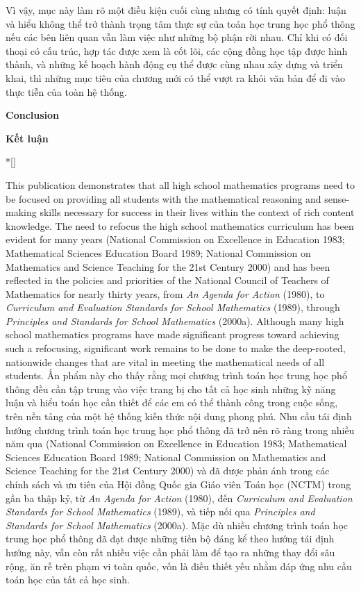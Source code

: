 \documentclass[
  10pt,
  a4paper,
  landscape,
  twoside,
  openany
]{scrbook}
\newcommand{\EN}[1]{#1}
\newcommand{\VI}[1]{#1}
\newcommand{\NOTE}[1]{#1}
\newcommand{\ParallelSection}[3]{%
  \refstepcounter{section}%
  \phantomsection
  \addcontentsline{toc}{section}{\hspace{0.3\baselineskip}#2}%
  \markright{#2}%
  {\noindent\normalfont\bfseries\large #1\par}
  \switchcolumn
  {\noindent\normalfont\bfseries\large #2\par}
  \switchcolumn
  {\noindent\normalfont #3\par}
  \switchcolumn[0]*[\vspace{0.7\baselineskip}]
}
\begin{document}
{{Vì vậy, mục này làm rõ một điều kiện cuối cùng nhưng có tính quyết định: luận và hiểu không thể trở thành trọng tâm thực sự của toán học trung học phổ thông nếu các bên liên quan vẫn làm việc như những bộ phận rời nhau. Chỉ khi có đối thoại có cấu trúc, hợp tác được xem là cốt lõi, các cộng đồng học tập được hình thành, và những kế hoạch hành động cụ thể được cùng nhau xây dựng và triển khai, thì những mục tiêu của chương mới có thể vượt ra khỏi văn bản để đi vào thực tiễn của toàn hệ thống.}
}

\ParallelSection
{Conclusion}
{Kết luận}
{}

\TriPara
{
\EN{This publication demonstrates that all high school mathematics programs need to be focused on providing all students with the mathematical reasoning and sense-making skills necessary for success in their lives within the context of rich content knowledge. The need to refocus the high school mathematics curriculum has been evident for many years (National Commission on Excellence in Education 1983; Mathematical Sciences Education Board 1989; National Commission on Mathematics and Science Teaching for the 21st Century 2000) and has been reflected in the policies and priorities of the National Council of Teachers of Mathematics for nearly thirty years, from \emph{An Agenda for Action} (1980), to \emph{Curriculum and Evaluation Standards for School Mathematics} (1989), through \emph{Principles and Standards for School Mathematics} (2000a). Although many high school mathematics programs have made significant progress toward achieving such a refocusing, significant work remains to be done to make the deep-rooted, nationwide changes that are vital in meeting the mathematical needs of all students.}
}
{
\VI{Ấn phẩm này cho thấy rằng mọi chương trình toán học trung học phổ thông đều cần tập trung vào việc trang bị cho tất cả học sinh những kỹ năng luận và hiểu toán học cần thiết để các em có thể thành công trong cuộc sống, trên nền tảng của một hệ thống kiến thức nội dung phong phú. Nhu cầu tái định hướng chương trình toán học trung học phổ thông đã trở nên rõ ràng trong nhiều năm qua (National Commission on Excellence in Education 1983; Mathematical Sciences Education Board 1989; National Commission on Mathematics and Science Teaching for the 21st Century 2000) và đã được phản ánh trong các chính sách và ưu tiên của Hội đồng Quốc gia Giáo viên Toán học (NCTM) trong gần ba thập kỷ, từ \emph{An Agenda for Action} (1980), đến \emph{Curriculum and Evaluation Standards for School Mathematics} (1989), và tiếp nối qua \emph{Principles and Standards for School Mathematics} (2000a). Mặc dù nhiều chương trình toán học trung học phổ thông đã đạt được những tiến bộ đáng kể theo hướng tái định hướng này, vẫn còn rất nhiều việc cần phải làm để tạo ra những thay đổi sâu rộng, ăn rễ trên phạm vi toàn quốc, vốn là điều thiết yếu nhằm đáp ứng nhu cầu toán học của tất cả học sinh.}
}
{
\NOTE{}
}
\end{document}
